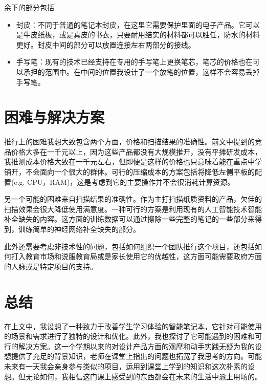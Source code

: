 \documentclass{article}
\begin{document}
余下的部分包括
\begin{itemize}
    \item 封皮：不同于普通的笔记本封皮，在这里它需要保护里面的电子产品。它可以是牛皮纸板，或是真皮的书衣，只要耐用结实的材料都可以胜任，防水的材料更好。封皮中间的部分可以放置连接左右两部分的接线。
    \item 手写笔：现有的技术已经支持在专用的手写笔上更换笔芯，笔芯的价格也在可以承担的范围中。在中间的位置我设计了一个放笔的位置，这样不会容易丢掉手写笔。
\end{itemize}

\section{困难与解决方案}

推行上的困难我想大致包含两个方面，价格和扫描结果的准确性。前文中提到的竞品价格大多在一千元以上，因为这些产品都没有大规模推开，没有平摊研发成本，我推测成本价格大致在一千元左右，但即便是这样的价格也只意味着能在重点中学铺开，不会面向一个很大的群体。可行的压缩成本的方案包括将降低左侧平板的配置(e.g. CPU，RAM)，这是考虑到它的主要操作并不会很消耗计算资源。

另一个可能的困难来自扫描结果的准确性。作为主打扫描纸质资料的产品，欠佳的扫描效果会很大降低使用满意度。一种可行的方案是利用现有的人工智能技术智能补全缺失的内容。这方面的训练数据可以通过擦除一些完整的笔记的一些部分来得到，训练简单的神经网络补全缺失的部分。

此外还需要考虑非技术性的问题，包括如何组织一个团队推行这个项目，还包括如何打入教育市场和说服教育局或是家长使用它的优越性，这方面可能需要政府方面的人脉或是特定项目的支持。

\section{总结}

在上文中，我设想了一种致力于改善学生学习体验的智能笔记本，它针对可能使用的场景和需求进行了独特的设计和优化。此外，我也探讨了它可能遇到的困难和可行的解决方案。这一个学期以来的对设计产品方面的观摩和动手实践无疑为我的设想提供了充足的背景知识，老师在课堂上指出的问题也拓宽了我思考的方向。可能未来有一天我会亲身参与类似的项目，运用到课堂上学到的知识和这次朴素的设想。但无论如何，我相信这门课上感受到的东西都会在未来的生活中派上用场的。
\end{document}
